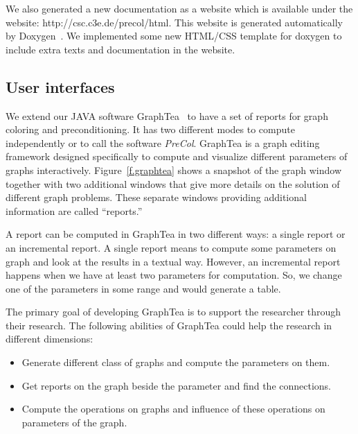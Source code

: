 \documentclass[12pt, twoside,a4paper,toc=bibliography]{scrbook}
\newcommand{\todo}[1]{\textbf{#1}}
\begin{document}
We also generated a new documentation as a website which is available
under the website: http://csc.c3e.de/precol/html.
This website is generated automatically by Doxygen~\cite{Lischner2013}.
We implemented some new HTML/CSS template for doxygen to include extra
texts and documentation in the website.


\subsection{User interfaces}
\label{s.interfaces}
We extend our JAVA software GraphTea~
\cite{2014:07,2014:15,2014:16,2015:05,2015:06,2015:07,2015:08} to have a
set of reports for graph coloring and preconditioning. It has two different modes
to compute independently or to call the software \textit{PreCol}.
GraphTea is a graph editing framework designed specifically to compute and visualize
different parameters of graphs interactively.
Figure~\ref{f.graphtea} shows a snapshot of the
graph window together with two additional windows that give more details on the solution
of different graph problems. These separate windows providing additional information are
called ``reports.''

A report can be computed in GraphTea in two different ways:
a single report or an incremental report.
A single report means to compute some parameters on graph and look at the results
in a textual way. However, an incremental report happens when we have at least
two parameters for computation. So, we change one of the parameters in
some range and would generate a table.

The primary goal of developing GraphTea is to support the researcher through their research.
The following abilities of GraphTea could help the research in different dimensions:
\begin{itemize}
\item Generate different class of graphs and compute the parameters on them.
\item Get reports on the graph beside the parameter and find the connections.
\item Compute the operations on graphs and influence of these operations on parameters
of the graph.
\end{itemize}
\end{document}
